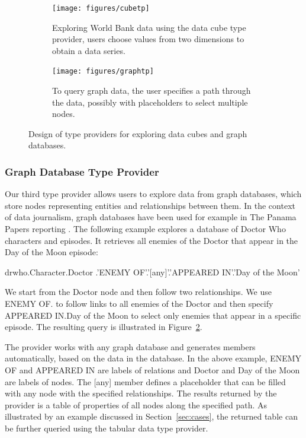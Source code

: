 \documentclass[manuscript,review,anonymous]{acmart}
\newcommand{\ikvd}[1]{{\fontfamily{zi4}\selectfont\small #1}}
\begin{document}
\begin{figure}
\centering
\begin{subfigure}[b]{0.5\textwidth}
  \centering
  \texttt{[image: figures/cubetp]}
  \vspace{0.5em}
  \caption{Exploring World Bank data using the data cube type provider, users
    choose values from two dimensions to obtain a data series.}
  \label{fig:cubetp}
\end{subfigure}
\hfill
\begin{subfigure}[b]{0.45\textwidth}
  \centering
  \texttt{[image: figures/graphtp]}
  \caption{To query graph data, the user specifies a path through the data, possibly with
    placeholders to select multiple nodes.}
  \label{fig:graphtp}
\end{subfigure}
\vspace{-0.5em}
\caption{Design of type providers for exploring data cubes and graph databases.}
\label{fig:tps}
\end{figure}


\subsubsection*{Graph Database Type Provider}
Our third type provider allows users to explore data from graph databases, which store
nodes representing entities and relationships between them. In the context of data journalism,
graph databases have been used for example in The Panama Papers reporting \cite{panama}.
The following example explores a database of Doctor Who characters and episodes. It retrieves
all enemies of the Doctor that appear in the Day of the Moon episode:

\begin{thegamma}
drwho.Character.Doctor
  .'ENEMY OF'.'[any]'.'APPEARED IN'.'Day of the Moon'
\end{thegamma}

\noindent
We start from the \ikvd{Doctor} node and then follow two relationships. We use
\ikvd{\textquotesingle ENEMY OF\textquotesingle.\textquotesingle [any]\textquotesingle}
to follow links to all enemies of the Doctor and then specify
\ikvd{\textquotesingle APPEARED IN\textquotesingle.\textquotesingle Day of the Moon\textquotesingle}
to select only enemies that appear in a specific episode. The resulting query
is illustrated in Figure~\ref{fig:graphtp}.

The provider works with any graph database and generates members automatically, based on the
data in the database. In the above example, \ikvd{ENEMY OF} and \ikvd{APPEARED IN} are labels
of relations and \ikvd{Doctor} and \ikvd{Day of the Moon} are labels of nodes. The
\ikvd{[any]} member defines a placeholder that can be filled with any node with the specified
relationships. The results returned by the provider is a table of properties of all nodes
along the specified path. As illustrated by an example discussed in Section~\ref{sec:cases},
the returned table can be further queried using the tabular data type provider.
\end{document}
